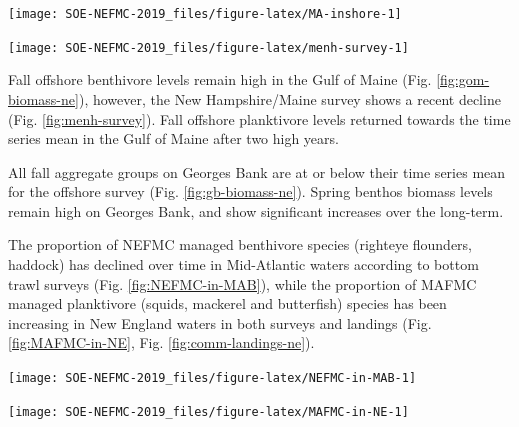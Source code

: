 \documentclass[10pt,]{article}
\let\origfigure\figure
\let\endorigfigure\endfigure
\renewenvironment{figure}[1][2] {
    \expandafter\origfigure\expandafter[H]
} {
    \endorigfigure
}
\begin{document}
\begin{figure}

{\centering \texttt{[image: SOE-NEFMC-2019\_files/figure-latex/MA-inshore-1]} 

}

\caption{Fall (left) and spring (right) surveyed biomass from the MA state inshore bottom trawl survey.}\label{fig:MA-inshore}
\end{figure}

\begin{figure}

{\centering \texttt{[image: SOE-NEFMC-2019\_files/figure-latex/menh-survey-1]} 

}

\caption{Fall (left) and spring (right) surveyed biomass from the ME/NH state inshore bottom trawl survey.}\label{fig:menh-survey}
\end{figure}

Fall offshore benthivore levels remain high in the Gulf of Maine (Fig.
\ref{fig:gom-biomass-ne}), however, the New Hampshire/Maine survey shows
a recent decline (Fig. \ref{fig:menh-survey}). Fall offshore planktivore
levels returned towards the time series mean in the Gulf of Maine after
two high years.

All fall aggregate groups on Georges Bank are at or below their time
series mean for the offshore survey (Fig. \ref{fig:gb-biomass-ne}).
Spring benthos biomass levels remain high on Georges Bank, and show
significant increases over the long-term.

The proportion of NEFMC managed benthivore species (righteye flounders,
haddock) has declined over time in Mid-Atlantic waters according to
bottom trawl surveys (Fig. \ref{fig:NEFMC-in-MAB}), while the proportion
of MAFMC managed planktivore (squids, mackerel and butterfish) species
has been increasing in New England waters in both surveys and landings
(Fig. \ref{fig:MAFMC-in-NE}, Fig. \ref{fig:comm-landings-ne}).

\begin{figure}

{\centering \texttt{[image: SOE-NEFMC-2019\_files/figure-latex/NEFMC-in-MAB-1]} 

}

\caption{New England-managed survey proportion of MAB benthivores.}\label{fig:NEFMC-in-MAB}
\end{figure}

\begin{figure}

{\centering \texttt{[image: SOE-NEFMC-2019\_files/figure-latex/MAFMC-in-NE-1]} 

}

\caption{Mid-Atlantic-managed survey proportion of GOM and GB planktivores.}\label{fig:MAFMC-in-NE}
\end{figure}
\end{document}
